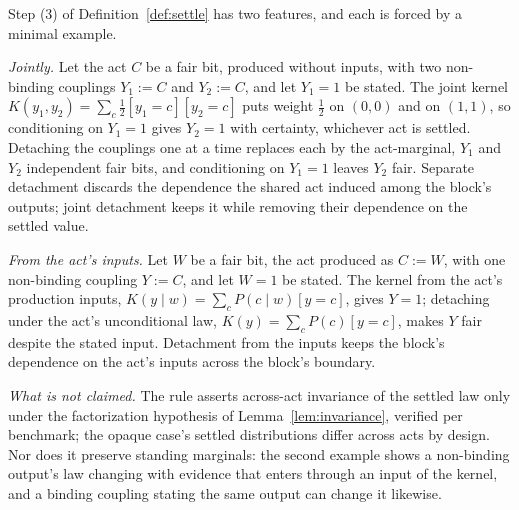 \noindent Step (3) of Definition~\ref{def:settle} has two features, and each is forced by a minimal example.

\emph{Jointly.} Let the act $C$ be a fair bit, produced without inputs, with two non-binding couplings $Y_1 := C$ and $Y_2 := C$, and let $Y_1 = 1$ be stated. The joint kernel $K(y_1, y_2) = \sum_c \tfrac12 [y_1 = c][y_2 = c]$ puts weight $\tfrac12$ on $(0,0)$ and on $(1,1)$, so conditioning on $Y_1 = 1$ gives $Y_2 = 1$ with certainty, whichever act is settled. Detaching the couplings one at a time replaces each by the act-marginal, $Y_1$ and $Y_2$ independent fair bits, and conditioning on $Y_1 = 1$ leaves $Y_2$ fair. Separate detachment discards the dependence the shared act induced among the block's outputs; joint detachment keeps it while removing their dependence on the settled value.

\emph{From the act's inputs.} Let $W$ be a fair bit, the act produced as $C := W$, with one non-binding coupling $Y := C$, and let $W = 1$ be stated. The kernel from the act's production inputs, $K(y \mid w) = \sum_c P(c \mid w)[y = c]$, gives $Y = 1$; detaching under the act's unconditional law, $K(y) = \sum_c P(c)[y = c]$, makes $Y$ fair despite the stated input. Detachment from the inputs keeps the block's dependence on the act's inputs across the block's boundary.

\emph{What is not claimed.} The rule asserts across-act invariance of the settled law only under the factorization hypothesis of Lemma~\ref{lem:invariance}, verified per benchmark; the opaque case's settled distributions differ across acts by design. Nor does it preserve standing marginals: the second example shows a non-binding output's law changing with evidence that enters through an input of the kernel, and a binding coupling stating the same output can change it likewise.

